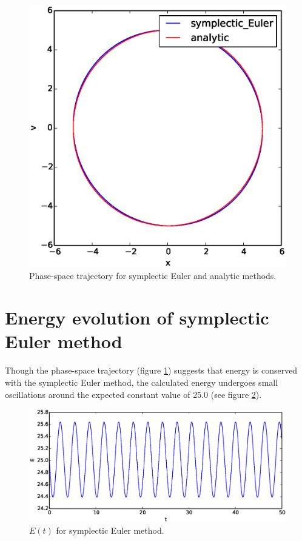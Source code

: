 \documentclass{article}
\theoremstyle{definition}
\renewcommand{\>}{\rangle}
\newcommand{\<}{\langle}
\begin{document}
\begin{figure}
\includegraphics[width=\textwidth]{combined_xv.eps}
\caption{\label{fig:symplectic_xv} Phase-space trajectory for symplectic Euler
and analytic methods.}
\end{figure}

\section{Energy evolution of symplectic Euler method}

Though the phase-space trajectory (figure \ref{fig:symplectic_xv}) suggests that energy
is conserved with the symplectic Euler method, the calculated energy undergoes small
oscillations around the expected constant value of 25.0 (see figure \ref{fig:symplectic_E}).

\begin{figure}
\includegraphics[width=\textwidth]{symplectic_E.eps}
\caption{\label{fig:symplectic_E} $E(t)$ for symplectic Euler method.} 
\end{figure}
\end{document}
